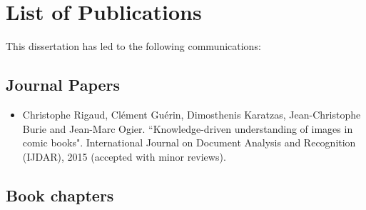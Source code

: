 \chapter{List of Publications}
\label{app:publications}


This dissertation has led to the following communications:

\section*{Journal Papers}

\begin{itemize}

\item Christophe Rigaud, Cl{\'e}ment Gu{\'e}rin, Dimosthenis Karatzas, Jean-Christophe Burie and Jean-Marc Ogier. ``Knowledge-driven understanding of images in comic books". International Journal on Document Analysis and Recognition (IJDAR), 2015 (accepted with minor reviews).
\vspace*{.3cm}

\vspace*{.3cm}

\end{itemize}

\section*{Book chapters}

